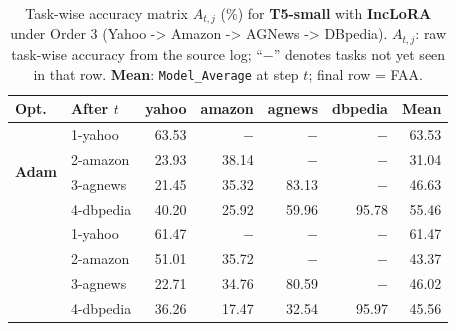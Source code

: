 \begin{table}[ht]
\centering
\caption{%
  Task-wise accuracy matrix $A_{t,j}$ (\%) for \textbf{T5-small} with \textbf{IncLoRA} under Order 3 (Yahoo -> Amazon -> AGNews -> DBpedia).
  $A_{t,j}$: raw task-wise accuracy from the source log; ``$-$'' denotes tasks not yet seen in that row.
  \textbf{Mean}: \texttt{Model\_Average} at step $t$; final row = FAA.
}
\label{tab:nlp_o3_t5small_inclora}
\setlength{\tabcolsep}{4.0pt}
\renewcommand{\arraystretch}{0.92}
\scriptsize
\begin{tabular}{@{}l l r r r r r@{}}
\toprule
\textbf{Opt.} & \textbf{After $t$} & \textbf{yahoo} & \textbf{amazon} & \textbf{agnews} & \textbf{dbpedia} & \textbf{Mean} \\
\midrule
\multirow{4}{*}{\textbf{Adam}} & 1-yahoo & 63.53 & $-$ & $-$ & $-$ & 63.53 \\
 & 2-amazon & 23.93 & 38.14 & $-$ & $-$ & 31.04 \\
 & 3-agnews & 21.45 & 35.32 & 83.13 & $-$ & 46.63 \\
 & 4-dbpedia & 40.20 & 25.92 & 59.96 & 95.78 & 55.46 \\
\addlinespace[2pt]
\multirow{4}{*}{\textbf{SAM}} & 1-yahoo & 61.47 & $-$ & $-$ & $-$ & 61.47 \\
 & 2-amazon & 51.01 & 35.72 & $-$ & $-$ & 43.37 \\
 & 3-agnews & 22.71 & 34.76 & 80.59 & $-$ & 46.02 \\
 & 4-dbpedia & 36.26 & 17.47 & 32.54 & 95.97 & 45.56 \\
\bottomrule
\end{tabular}
\end{table}

